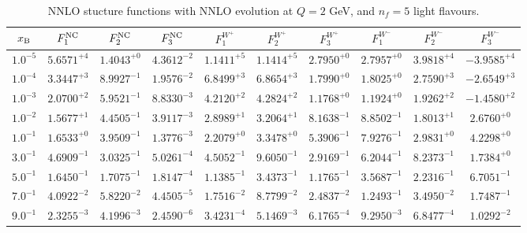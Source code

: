\begin{table}[h]
\begin{adjustbox}{width=\textwidth}
\begin{tabular}{|c||c|c|c|c|c|c|c|c|c|}
\hline
$x_{\rm B}$ & $F_1^{\rm NC}$ & $F_2^{\rm NC}$ & $F_3^{\rm NC}$ & $F_1^{W^+}$ & $F_2^{W^+}$ & $F_3^{W^+}$ & $F_1^{W^-}$ & $F_2^{W^-}$ & $F_3^{W^-}$ \\
\hline
$ 1.0^{-5}$ & $ 5.6571^{+4}$ & $ 1.4043^{+0}$ & $ 4.3612^{-2}$ & $ 1.1411^{+5}$ & $ 1.1414^{+5}$ & $ 2.7950^{+0}$ & $ 2.7957^{+0}$ & $ 3.9818^{+4}$ & $-3.9585^{+4}$ \\
$ 1.0^{-4}$ & $ 3.3447^{+3}$ & $ 8.9927^{-1}$ & $ 1.9576^{-2}$ & $ 6.8499^{+3}$ & $ 6.8654^{+3}$ & $ 1.7990^{+0}$ & $ 1.8025^{+0}$ & $ 2.7590^{+3}$ & $-2.6549^{+3}$ \\
$ 1.0^{-3}$ & $ 2.0700^{+2}$ & $ 5.9521^{-1}$ & $ 8.8330^{-3}$ & $ 4.2120^{+2}$ & $ 4.2824^{+2}$ & $ 1.1768^{+0}$ & $ 1.1924^{+0}$ & $ 1.9262^{+2}$ & $-1.4580^{+2}$ \\
$ 1.0^{-2}$ & $ 1.5677^{+1}$ & $ 4.4505^{-1}$ & $ 3.9117^{-3}$ & $ 2.8989^{+1}$ & $ 3.2064^{+1}$ & $ 8.1638^{-1}$ & $ 8.8502^{-1}$ & $ 1.8013^{+1}$ & $ 2.6760^{+0}$ \\
$ 1.0^{-1}$ & $ 1.6533^{+0}$ & $ 3.9509^{-1}$ & $ 1.3776^{-3}$ & $ 2.2079^{+0}$ & $ 3.3478^{+0}$ & $ 5.3906^{-1}$ & $ 7.9276^{-1}$ & $ 2.9831^{+0}$ & $ 4.2298^{+0}$ \\
$ 3.0^{-1}$ & $ 4.6909^{-1}$ & $ 3.0325^{-1}$ & $ 5.0261^{-4}$ & $ 4.5052^{-1}$ & $ 9.6050^{-1}$ & $ 2.9169^{-1}$ & $ 6.2044^{-1}$ & $ 8.2373^{-1}$ & $ 1.7384^{+0}$ \\
$ 5.0^{-1}$ & $ 1.6450^{-1}$ & $ 1.7075^{-1}$ & $ 1.8147^{-4}$ & $ 1.1385^{-1}$ & $ 3.4373^{-1}$ & $ 1.1765^{-1}$ & $ 3.5687^{-1}$ & $ 2.2316^{-1}$ & $ 6.7051^{-1}$ \\
$ 7.0^{-1}$ & $ 4.0922^{-2}$ & $ 5.8220^{-2}$ & $ 4.4505^{-5}$ & $ 1.7516^{-2}$ & $ 8.7799^{-2}$ & $ 2.4837^{-2}$ & $ 1.2493^{-1}$ & $ 3.4950^{-2}$ & $ 1.7487^{-1}$ \\
$ 9.0^{-1}$ & $ 2.3255^{-3}$ & $ 4.1996^{-3}$ & $ 2.4590^{-6}$ & $ 3.4231^{-4}$ & $ 5.1469^{-3}$ & $ 6.1765^{-4}$ & $ 9.2950^{-3}$ & $ 6.8477^{-4}$ & $ 1.0292^{-2}$ \\
\hline
\end{tabular}
\end{adjustbox}\caption{NNLO stucture functions with NNLO evolution at $Q = 2$ GeV, and $n_f=5$ light flavours.}
\label{tab:N2LO-Q2}
\end{table}


